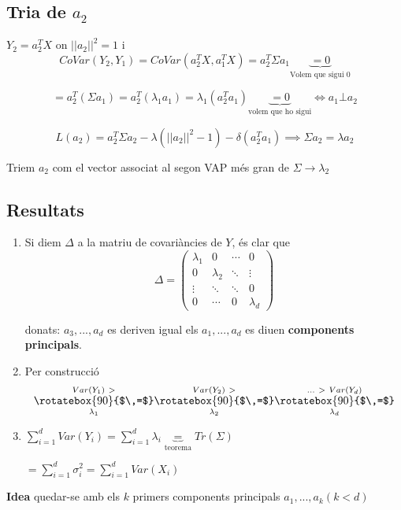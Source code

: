\documentclass[a4paper]{article}
\newcommand{\verteq}{\rotatebox{90}{$\,=$}}
\begin{document}
	\subsection{Tria de $a_2$}
	
	$Y_2 = a_2^TX$ on $||a_2||^2 = 1$ i \[CoVar(Y_2, Y_1) = CoVar(a_2^TX, a_1^TX) = a_2^T\Sigma a_1 \underbrace{= 0}_\text{Volem que sigui 0}\] 
	
	\[ = a_2^T(\Sigma a_1) = a_2^T(\lambda_1 a_1) = \lambda_1 (a_2^Ta_1) \underbrace{= 0}_\text{volem que ho sigui} \Leftrightarrow a_1 \bot a_2 \]
	
	\[ L(a_2) = a_2^T\Sigma a_2 - \lambda(||a_2||^2 - 1) - \delta(a_2^Ta_1) \implies \Sigma a_2 = \lambda a_2 \]
	
	Triem $a_2$ com el vector associat al segon VAP més gran de $\Sigma \rightarrow \lambda_2$
	
	\subsection{Resultats}
	\begin{enumerate}
		\item Si diem $\Delta$ a la matriu de covariàncies de $Y$, és clar que
		\[ \Delta = 
		\begin{pmatrix}
		\lambda_1 & 0 & \cdots & 0 \\
		0 & \lambda_2 & \ddots  & \vdots \\
		\vdots & \ddots & \ddots & 0 \\
		0 & \cdots & 0 &  \lambda_d
		\end{pmatrix} \]
		
		donats: $a_3, ..., a_d$ es deriven igual els $a_1, ..., a_d$ es diuen \textbf{components principals}.
		
		\item Per construcció
		\begin{equation}			
			\overset{Var(Y_1)\ >}{\underset{\lambda_1}{\verteq}} \overset{Var(Y_2)\ >}{\underset{\lambda_2}{\verteq}}
			\overset{...\ >\ Var(Y_d)}{\underset{\lambda_d}{\verteq}}
		\end{equation}
		 
		
		\item $\sum_{i=1}^d Var(Y_i) = \sum_{i=1}^d \lambda_i \underbrace{=}_\text{teorema} Tr(\Sigma)$
		
		$ = \sum_{i=1}^d \sigma_i^2 = \sum_{i=1}^d Var(X_i)$
	\end{enumerate}
	
	\textbf{Idea} quedar-se amb els $k$ primers components principals $a_1, ..., a_k (k < d)$
	
\end{document}
